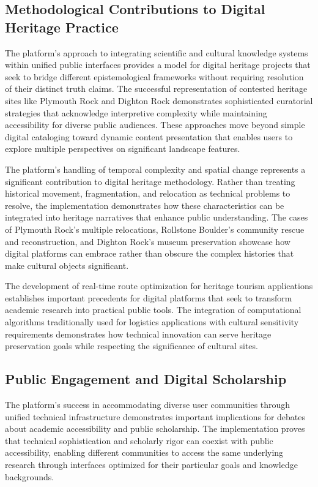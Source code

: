 \subsection{Methodological Contributions to Digital Heritage Practice}
\label{subsec:methodological_contributions}

The platform's approach to integrating scientific and cultural knowledge systems within unified public interfaces provides a model for digital heritage projects that seek to bridge different epistemological frameworks without requiring resolution of their distinct truth claims. The successful representation of contested heritage sites like Plymouth Rock and Dighton Rock demonstrates sophisticated curatorial strategies that acknowledge interpretive complexity while maintaining accessibility for diverse public audiences. These approaches move beyond simple digital cataloging toward dynamic content presentation that enables users to explore multiple perspectives on significant landscape features.

The platform's handling of temporal complexity and spatial change represents a significant contribution to digital heritage methodology. Rather than treating historical movement, fragmentation, and relocation as technical problems to resolve, the implementation demonstrates how these characteristics can be integrated into heritage narratives that enhance public understanding. The cases of Plymouth Rock's multiple relocations, Rollstone Boulder's community rescue and reconstruction, and Dighton Rock's museum preservation showcase how digital platforms can embrace rather than obscure the complex histories that make cultural objects significant.

The development of real-time route optimization for heritage tourism applications establishes important precedents for digital platforms that seek to transform academic research into practical public tools. The integration of computational algorithms traditionally used for logistics applications with cultural sensitivity requirements demonstrates how technical innovation can serve heritage preservation goals while respecting the significance of cultural sites.

\subsection{Public Engagement and Digital Scholarship}
\label{subsec:public_engagement_significance}

The platform's success in accommodating diverse user communities through unified technical infrastructure demonstrates important implications for debates about academic accessibility and public scholarship. The implementation proves that technical sophistication and scholarly rigor can coexist with public accessibility, enabling different communities to access the same underlying research through interfaces optimized for their particular goals and knowledge backgrounds.

